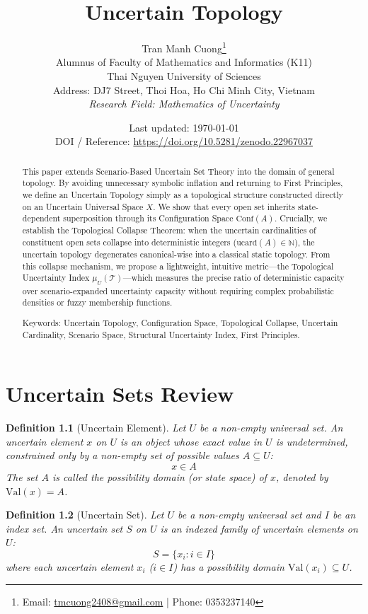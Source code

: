 \documentclass[a4paper,14pt, twoside]{memoir}
\title{Uncertain Topology}
\author{
	Tran Manh Cuong\thanks{Email: \href{mailto:tmcuong2408@gmail.com}{tmcuong2408@gmail.com} | Phone: 0353237140} \\[0.5em]
	\small Alumnus of Faculty of Mathematics and Informatics (K11)
	\\ Thai Nguyen University of Sciences \\
	\small Address: DJ7 Street, Thoi Hoa, Ho Chi Minh City, Vietnam \\
	\small \textit{Research Field: Mathematics of Uncertainty}
}
\date{Last updated: \today \\ \small DOI / Reference: \url{https://doi.org/10.5281/zenodo.22967037} \cite{uset}}
\newtheorem{definition}{Definition}[chapter]
\begin{document}
\maketitle

\begin{abstract}
	This paper extends Scenario-Based Uncertain Set Theory into the domain of general topology. By avoiding unnecessary symbolic inflation and returning to First Principles, we define an Uncertain Topology simply as a topological structure constructed directly on an Uncertain Universal Space $X$. We show that every open set inherits state-dependent superposition through its Configuration Space $\mathrm{Conf}(A)$. Crucially, we establish the Topological Collapse Theorem: when the uncertain cardinalities of constituent open sets collapse into deterministic integers ($\mathrm{ucard}(A) \in \mathbb{N}$), the uncertain topology degenerates canonical-wise into a classical static topology. From this collapse mechanism, we propose a lightweight, intuitive metric—the Topological Uncertainty Index $\mu_U(\mathcal{T})$—which measures the precise ratio of deterministic capacity over scenario-expanded uncertainty capacity without requiring complex probabilistic densities or fuzzy membership functions.

	\vspace{1em}
	\noindent Keywords: Uncertain Topology, Configuration Space, Topological Collapse, Uncertain Cardinality, Scenario Space, Structural Uncertainty Index, First Principles.
\end{abstract}

\chapter{Uncertain Sets Review}

\begin{definition}[Uncertain Element]
	Let $U$ be a non-empty universal set. An uncertain element $x$ on $U$ is an object whose exact value in $U$ is undetermined, constrained only by a non-empty set of possible values $A \subseteq U$:
	\[
		x \in A
	\]
	The set $A$ is called the possibility domain (or state space) of $x$, denoted by $\mathrm{Val}(x) = A$.
\end{definition}

\begin{definition}[Uncertain Set]
	Let $U$ be a non-empty universal set and $I$ be an index set. An uncertain set $S$ on $U$ is an indexed family of uncertain elements on $U$:
	\[
		S = \{x_i : i \in I\}
	\]
	where each uncertain element $x_i$ ($i \in I$) has a possibility domain $\mathrm{Val}(x_i) \subseteq U$.
\end{definition}
\end{document}
